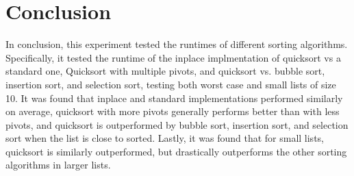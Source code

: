 \documentclass{article}
\begin{document}
\section*{Conclusion}
In conclusion, this experiment tested the runtimes of different sorting algorithms. Specifically, it tested the runtime of the inplace implmentation of quicksort vs a standard one, Quicksort with multiple pivots, and quicksort vs. bubble sort, insertion sort, and selection sort, testing both worst case and small lists of size 10. It was found that inplace and standard implementations performed similarly on average, quicksort with more pivots generally performs better than with less pivots, and quicksort is outperformed by bubble sort, insertion sort, and selection sort when the list is close to sorted. Lastly, it was found that for small lists, quicksort is similarly outperformed, but drastically outperforms the other sorting algorithms in larger lists.
\end{document}
